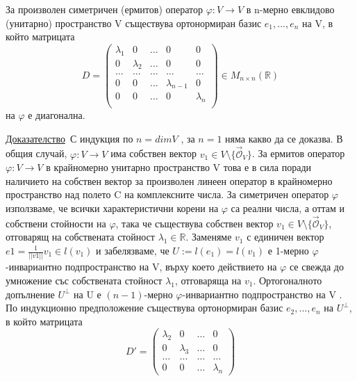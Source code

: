 \documentclass{article}
\newcommand*{\nullvec}{\vec{\mathcal{O}}}
\newcommand*{\bR}{\mathbb{R}}
\newcommand*{\mat}[2]{M_{{#1}\times {#2}}}
\newcommand{\dok}{\underline{Доказателство}\  }
\newcommand{\tvurdenie}[2]{
    \begin{tcolorbox}[title = #1 ,colframe = blue!70!black, colback = blue!10!white]
        #2
    \end{tcolorbox}
}
\begin{document}
\tvurdenie{Твърдение 22.7}{
    За произволен симетричен (ермитов) оператор $\varphi : V \rightarrow V$ в n-мерно
    евклидово (унитарно) пространство V съществува ортонормиран базис $e_1, . . . , e_n$ на V,
    в който матрицата
    \[
        D=\left(\begin{array}{ccccc}
                \lambda_1 & 0         & \dots & 0             & 0         \\
                0         & \lambda_2 & \dots & 0             & 0         \\
                \dots     & \dots     & \dots & \dots         & \dots     \\
                0         & 0         & \dots & \lambda_{n-1} & 0         \\
                0         & 0         & \dots & 0             & \lambda_n \\
            \end{array}\right)\in \mat{n}{n}(\bR)
    \]
    на $\varphi$ е диагонална.
}
\dok С индукция по $n = dim V$ , за $n = 1$ няма какво да се
доказва. В общия случай, $\varphi : V \rightarrow V$ има собствен вектор $v_1 \in V \setminus \{\nullvec_V\}$.
За ермитов оператор $\varphi : V \rightarrow V$ в крайномерно унитарно пространство V това е
в сила поради наличието на собствен вектор за произволен линеен оператор в
крайномерно пространство над полето C на комплексните числа. За симетричен оператор $\varphi$
използваме, че всички характеристични корени на $\varphi$ са реални
числа, а оттам и собствени стойности на $\varphi$, така че съществува собствен вектор
$v_1 \in V \setminus \{\nullvec_V\}$, отговарящ на собствената стойност $\lambda_1 \in \bR$.
Заменяме $v_1$ с единичен вектор $e1 =\frac{1}{||v1||}v_1 \in l(v_1)$ и забелязваме,
че $U := l(e_1) = l(v_1)$ е 1-мерно $\varphi$-инвариантно подпространство на V, върху което
действието на $\varphi$ се свежда до умножение със собствената стойност $\lambda_1$, отговаряща
на $v_1$. Ортогоналното допълнение $U^\perp$ на U е $(n-1)$-мерно $\varphi$-инвариантно
подпространство на V . По индукционно предположение съществува ортонормиран базис
$e_2, . . . , e_n$ на $U^\perp$, в който матрицата
\[
    D'=\left(\begin{array}{cccc}
            \lambda_2 & 0         & \dots & 0         \\
            0         & \lambda_3 & \dots & 0         \\
            \dots     & \dots     & \dots & \dots     \\
            0         & 0         & \dots & \lambda_n
        \end{array}
    \right)
\]
\end{document}
